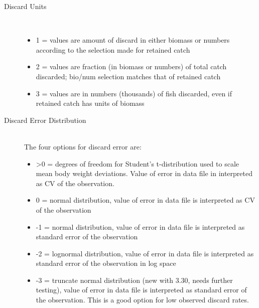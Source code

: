 \begin{description}
	\item[Discard Units]\ 
	\begin{itemize}
		\item 1 = values are amount of discard in either biomass or numbers according to the selection made for retained catch
		\item 2 = values are fraction (in biomass or numbers) of total catch discarded; bio/num selection matches that of retained catch
		\item 3 = values are in numbers (thousands) of fish discarded, even if retained catch has units of biomass
	\end{itemize}
	\item[Discard Error Distribution]\hfill\\
	The four options for discard error are:
	\begin{itemize}
		\item >0 = degrees of freedom for Student's t-distribution used to scale mean body weight deviations.  Value of error in data file in interpreted as CV of the observation.
		\item 0 = normal distribution, value of error in data file is interpreted as CV of the observation
		\item -1 = normal distribution, value of error in data file is interpreted as standard error of the observation
		\item -2 = lognormal distribution, value of error in data file is interpreted as standard error of the observation in log space 
		\item -3 = truncate normal distribution (new with 3.30, needs further testing), value of error in data file is interpreted as standard error of the observation.  This is a good option for low observed discard rates.


\end{itemize}
\end{description}
